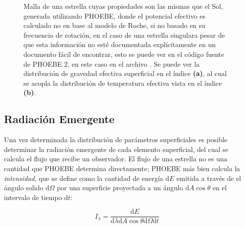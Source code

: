 \begin{figure}[!ht]
	\centering

	\caption[Distribución de gravedad superficial y temperatura efectiva
	local.]{Malla de una estrella cuyas propiedades son las mismas que el Sol,
	generada utilizando PHOEBE, donde el potencial efectivo es calculado no en
	base al modelo de Roche, si no basado en su frecuencia de rotación, en el
	caso de una estrella singular\textemdash a pesar de que esta información no
	esté documentada explícitamente en un documento fácil de encontrar, esto se
	puede ver en el código fuente de PHOEBE 2, en este caso en el archivo
	\href{https://github.com/phoebe-project/phoebe2/blob/master/phoebe/distortions/rotstar.py}{}.
	Se puede ver la distribución de gravedad efectiva superficial en el índice
	\textbf{(a)}, al cual se acopla la distribución de temperatura efectiva
	vista en el índice \textbf{(b)}.}
	\label{figuraMallaPhoebeTeffLogg}
\end{figure}

\subsection{Radiación Emergente}

Una vez determinada la distribución de parámetros superficiales es posible
determinar la radiación emergente de cada elemento superficial, del cual se
calcula el flujo que recibe un observador. El flujo de una estrella no es una
cantidad que PHOEBE determina directamente; PHOEBE más bien calcula la
\textit{intensidad}, que se define como la cantidad de energía $\mathrm{d}E$
emitida a través de el ángulo solido $\mathrm{d}\Omega$ por una superficie
proyectada a un ángulo $\mathrm{d}A \cos{\theta}$ en el intervalo de tiempo
$\mathrm{d}t$:

\begin{eqfloat}[!ht]
	\centering
	\begin{equation}
		I_{\lambda} = \frac{\textrm{d}E}{\textrm{d}\lambda \textrm{d}A \cos{\theta} \textrm{d}\Omega \textrm{d}t}
	\end{equation}
	\blankcaption
	\label{ecuacionIntensidadMonocromatica}
\end{eqfloat}

